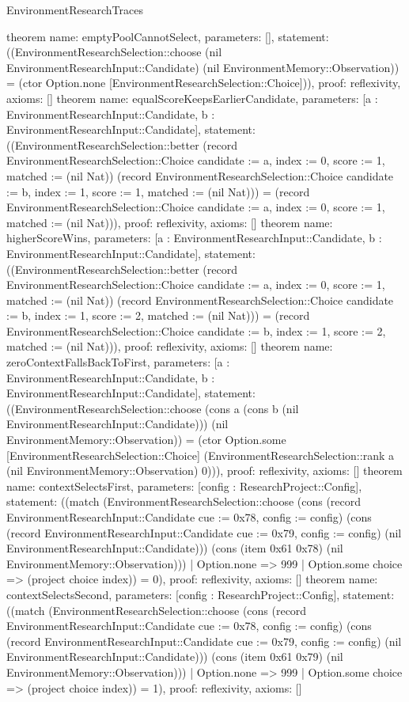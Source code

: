 \begin{lexlean}{EnvironmentResearchTraces}
\begin{semanticmodule}
{}
theorem{
 name: emptyPoolCannotSelect, parameters: [],
 statement: ((EnvironmentResearchSelection::choose (nil EnvironmentResearchInput::Candidate) (nil EnvironmentMemory::Observation)) = (ctor Option.none [EnvironmentResearchSelection::Choice])), proof: reflexivity{}, axioms: []
}
theorem{
 name: equalScoreKeepsEarlierCandidate, parameters: [a : EnvironmentResearchInput::Candidate, b : EnvironmentResearchInput::Candidate],
 statement: ((EnvironmentResearchSelection::better (record EnvironmentResearchSelection::Choice {candidate := a, index := 0, score := 1, matched := (nil Nat)}) (record EnvironmentResearchSelection::Choice {candidate := b, index := 1, score := 1, matched := (nil Nat)})) = (record EnvironmentResearchSelection::Choice {candidate := a, index := 0, score := 1, matched := (nil Nat)})), proof: reflexivity{}, axioms: []
}
theorem{
 name: higherScoreWins, parameters: [a : EnvironmentResearchInput::Candidate, b : EnvironmentResearchInput::Candidate],
 statement: ((EnvironmentResearchSelection::better (record EnvironmentResearchSelection::Choice {candidate := a, index := 0, score := 1, matched := (nil Nat)}) (record EnvironmentResearchSelection::Choice {candidate := b, index := 1, score := 2, matched := (nil Nat)})) = (record EnvironmentResearchSelection::Choice {candidate := b, index := 1, score := 2, matched := (nil Nat)})), proof: reflexivity{}, axioms: []
}
theorem{
 name: zeroContextFallsBackToFirst, parameters: [a : EnvironmentResearchInput::Candidate, b : EnvironmentResearchInput::Candidate],
 statement: ((EnvironmentResearchSelection::choose (cons a (cons b (nil EnvironmentResearchInput::Candidate))) (nil EnvironmentMemory::Observation)) = (ctor Option.some [EnvironmentResearchSelection::Choice] (EnvironmentResearchSelection::rank a (nil EnvironmentMemory::Observation) 0))), proof: reflexivity{}, axioms: []
}
theorem{
 name: contextSelectsFirst, parameters: [config : ResearchProject::Config],
 statement: ((match (EnvironmentResearchSelection::choose (cons (record EnvironmentResearchInput::Candidate {cue := 0x78, config := config}) (cons (record EnvironmentResearchInput::Candidate {cue := 0x79, config := config}) (nil EnvironmentResearchInput::Candidate))) (cons (item 0x61 0x78) (nil EnvironmentMemory::Observation))) | Option.none => 999 | Option.some choice => (project choice index)) = 0), proof: reflexivity{}, axioms: []
}
theorem{
 name: contextSelectsSecond, parameters: [config : ResearchProject::Config],
 statement: ((match (EnvironmentResearchSelection::choose (cons (record EnvironmentResearchInput::Candidate {cue := 0x78, config := config}) (cons (record EnvironmentResearchInput::Candidate {cue := 0x79, config := config}) (nil EnvironmentResearchInput::Candidate))) (cons (item 0x61 0x79) (nil EnvironmentMemory::Observation))) | Option.none => 999 | Option.some choice => (project choice index)) = 1), proof: reflexivity{}, axioms: []
}
\end{semanticmodule}
\end{lexlean}
